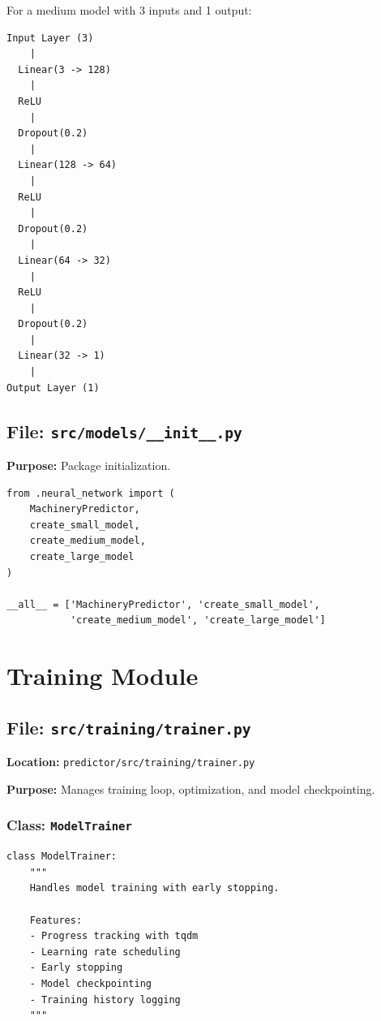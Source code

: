 \documentclass[11pt,a4paper]{article}
\begin{document}
For a medium model with 3 inputs and 1 output:

\begin{verbatim}
Input Layer (3)
    |
  Linear(3 -> 128)
    |
  ReLU
    |
  Dropout(0.2)
    |
  Linear(128 -> 64)
    |
  ReLU
    |
  Dropout(0.2)
    |
  Linear(64 -> 32)
    |
  ReLU
    |
  Dropout(0.2)
    |
  Linear(32 -> 1)
    |
Output Layer (1)
\end{verbatim}

\subsection{File: \texttt{src/models/\_\_init\_\_.py}}

\textbf{Purpose:} Package initialization.

\begin{lstlisting}
from .neural_network import (
    MachineryPredictor,
    create_small_model,
    create_medium_model,
    create_large_model
)

__all__ = ['MachineryPredictor', 'create_small_model',
           'create_medium_model', 'create_large_model']
\end{lstlisting}

\newpage
\section{Training Module}

\subsection{File: \texttt{src/training/trainer.py}}

\textbf{Location:} \texttt{predictor/src/training/trainer.py}

\textbf{Purpose:} Manages training loop, optimization, and model checkpointing.

\subsubsection{Class: \texttt{ModelTrainer}}

\begin{lstlisting}
class ModelTrainer:
    """
    Handles model training with early stopping.

    Features:
    - Progress tracking with tqdm
    - Learning rate scheduling
    - Early stopping
    - Model checkpointing
    - Training history logging
    """
\end{lstlisting}
\end{document}

